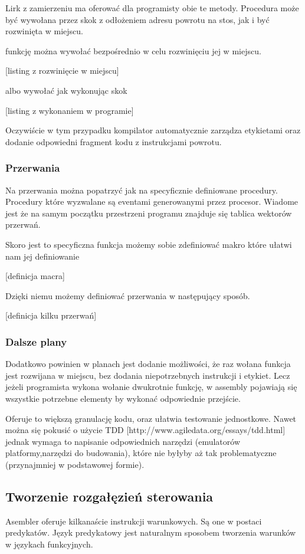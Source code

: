 \documentclass[11pt]{article}
\begin{document}
Lirk z zamierzeniu ma oferować dla programisty obie te metody. Procedura może być wywołana przez skok z odłożeniem adresu powrotu na stos, jak i być rozwinięta w miejscu.

funkcję można wywołać bezpośrednio w celu rozwinięciu jej w miejscu.

[listing z rozwinięcie w miejscu]

albo wywołać jak wykonując skok

[listing z wykonaniem w programie]

Oczywiście w tym przypadku kompilator automatycznie zarządza etykietami oraz dodanie odpowiedni fragment kodu z instrukcjami powrotu.

\subsubsection{Przerwania}

Na przerwania można popatrzyć jak na specyficznie definiowane procedury. Procedury które wyzwalane są eventami generowanymi przez procesor. Wiadome jest że na samym początku przestrzeni programu znajduje się tablica wektorów przerwań.

Skoro jest to specyficzna funkcja możemy sobie zdefiniować makro które ułatwi nam jej definiowanie

[definicja macra]

Dzięki niemu możemy definiować przerwania w następujący sposób.

[definicja kilku przerwań]

\subsubsection{Dalsze plany}

Dodatkowo powinien w planach jest dodanie możliwości, że raz wołana funkcja jest rozwijana w miejscu, bez dodania niepotrzebnych instrukcji i etykiet. Lecz jeżeli programista wykona wołanie dwukrotnie funkcję, w assembly pojawiają się wszystkie potrzebne elementy by wykonać odpowiednie przejście.

Oferuje to większą granulację kodu, oraz ułatwia testowanie jednostkowe. Nawet można się pokusić o użycie TDD [http://www.agiledata.org/essays/tdd.html] jednak wymaga to napisanie odpowiednich narzędzi (emulatorów platformy,narzędzi do budowania), które nie byłyby aż tak problematyczne (przynajmniej w podstawowej formie).

\subsection{Tworzenie rozgałęzień sterowania}
Asembler oferuje kilkanaście instrukcji warunkowych. Są one w postaci predykatów. Język predykatowy jest naturalnym sposobem tworzenia warunków w językach funkcyjnych. 
\end{document}

